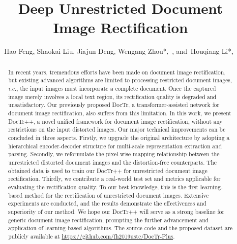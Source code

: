 \documentclass[lettersize,journal]{IEEEtran}
\begin{document}
\title{Deep Unrestricted Document Image Rectification}

\author{Hao Feng,
 Shaokai Liu,
 Jiajun Deng,
 Wengang Zhou*,~,  and~Houqiang Li*,~}





\maketitle

\begin{abstract}
In recent years, tremendous efforts have been made on document image rectification, 
but existing advanced algorithms are limited to processing restricted document images, 
\emph{i.e.}, the input images must incorporate a complete document. 
Once the captured image merely involves a local text region,
its rectification quality is degraded and unsatisfactory. 
Our previously proposed DocTr, a transformer-assisted network for document image rectification, also suffers from this limitation.
In this work, we present DocTr++, 
a novel unified framework for document image rectification,
without any restrictions on the input distorted images.
Our major technical improvements can be concluded in three aspects.
Firstly,
we upgrade the original architecture by adopting a hierarchical encoder-decoder structure for multi-scale representation extraction and parsing.
Secondly,
we reformulate the pixel-wise mapping relationship between the unrestricted distorted document images and the distortion-free counterparts.
The obtained data is used to train our DocTr++ for unrestricted document image rectification.
Thirdly, we contribute a real-world test set and metrics applicable for evaluating the rectification quality.
To our best knowledge, this is the first learning-based method for the rectification of unrestricted document images.
Extensive experiments are conducted, 
and the results demonstrate the effectiveness and superiority of our method.
We hope our DocTr++ will serve as a strong baseline for generic document image rectification,
prompting the further advancement and application of learning-based algorithms.
The source code and the proposed dataset are publicly available at \url{https://github.com/fh2019ustc/DocTr-Plus}.
\end{abstract}
\end{document}
